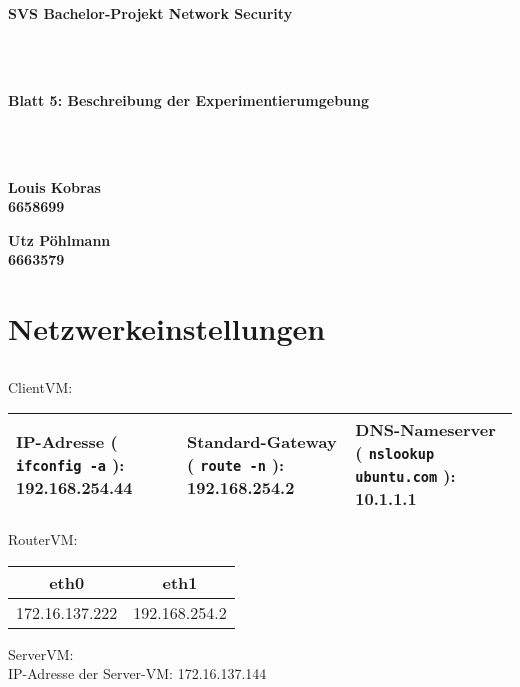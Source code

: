 \documentclass[twoside]{article}
\newcommand{\ttt}[1]{%
	\texttt{#1}%
}
\begin{document}
\pagestyle{fancy}
\fancyhead{}
\fancyfoot{}

\begin{center}
\begin{Huge}
\textbf{SVS Bachelor-Projekt Network Security}
\end{Huge}\\\-\\
\begin{Large}
\textbf{Blatt 5: Beschreibung der Experimentierumgebung}
\end{Large}\\\-\\
\begin{minipage}[t]{0.48\textwidth}
\begin{center}\textbf{
	Louis Kobras\\
	6658699}
\end{center}
\end{minipage}
\begin{minipage}[t]{0.48\textwidth}
\begin{center}\textbf{
	Utz Pöhlmann\\
	6663579}
\end{center}
\end{minipage}
\end{center}

\section{Netzwerkeinstellungen}
\label{sec:network-settings}
	\setcounter{subsection}{1}
	\subsection{}
	\label{ssec:1.2}
	ClientVM:\\
	\begin{center}\begin{tabular}{|p{}|p{}|p{}|}\hline
		\textbf{IP-Adresse} (\ttt{ifconfig -a}): 192.168.254.44&
		\textbf{Standard-Gateway} (\ttt{route -n}): 192.168.254.2&
		\textbf{DNS-Nameserver} (\ttt{nslookup ubuntu.com}): 10.1.1.1\\\hline
	\end{tabular}\end{center}
	RouterVM:\\
	\begin{center}\begin{tabular}{|c|c|}\hline
		eth0	&	eth1	\\\hline
		172.16.137.222	&	192.168.254.2\\\hline
	\end{tabular}\end{center}
	ServerVM:\\
	IP-Adresse der Server-VM: 172.16.137.144
\end{document}
